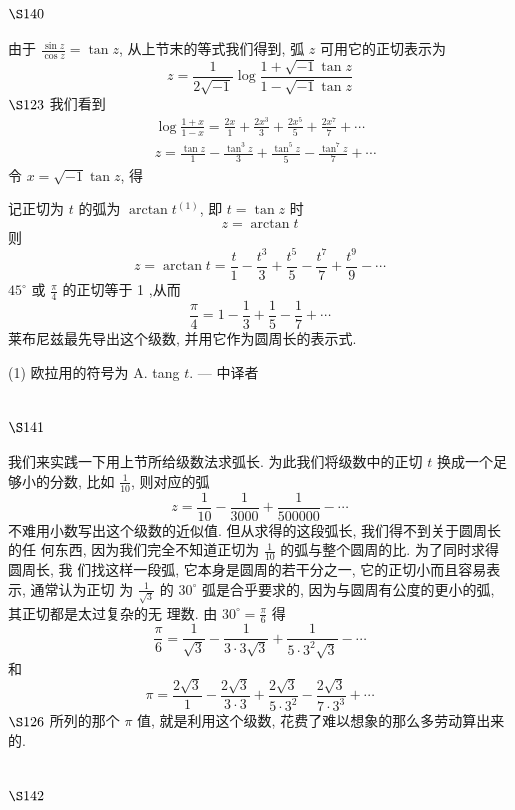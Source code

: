 \section{$\S 140$}

由于 $\frac{\sin z}{\cos z}=\tan z$, 从上节末的等式我们得到, 弧 $z$ 可用它的正切表示为
\[
z=\frac{1}{2 \sqrt{-1}} \log \frac{1+\sqrt{-1} \tan z}{1-\sqrt{-1} \tan z}
\]
$\S 123$ 我们看到
\[
\begin{aligned}
& \log \frac{1+x}{1-x}=\frac{2 x}{1}+\frac{2 x^{3}}{3}+\frac{2 x^{5}}{5}+\frac{2 x^{7}}{7}+\cdots \\
& z=\frac{\tan z}{1}-\frac{\tan ^{3} z}{3}+\frac{\tan ^{5} z}{5}-\frac{\tan ^{7} z}{7}+\cdots
\end{aligned}
\]
令 $x=\sqrt{-1} \tan z$, 得

记正切为 $t$ 的弧为 $\arctan t^{(1)}$, 即 $t=\tan z$ 时
\[
z=\arctan t
\]
则
\[
z=\arctan t=\frac{t}{1}-\frac{t^{3}}{3}+\frac{t^{5}}{5}-\frac{t^{7}}{7}+\frac{t^{9}}{9}-\cdots
\]
$45^{\circ}$ 或 $\frac{\pi}{4}$ 的正切等于 1 ,从而
\[
\frac{\pi}{4}=1-\frac{1}{3}+\frac{1}{5}-\frac{1}{7}+\cdots
\]
莱布尼兹最先导出这个级数, 并用它作为圆周长的表示式.

(1) 欧拉用的符号为 A. tang $t$. — 中译者 

\section{$\S 141$}

我们来实践一下用上节所给级数法求弧长. 为此我们将级数中的正切 $t$ 换成一个足 够小的分数, 比如 $\frac{1}{10}$, 则对应的弧
\[
z=\frac{1}{10}-\frac{1}{3000}+\frac{1}{500000}-\cdots
\]
不难用小数写出这个级数的近似值. 但从求得的这段弧长, 我们得不到关于圆周长的任 何东西, 因为我们完全不知道正切为 $\frac{1}{10}$ 的弧与整个圆周的比. 为了同时求得圆周长, 我 们找这样一段弧, 它本身是圆周的若干分之一, 它的正切小而且容易表示, 通常认为正切 为 $\frac{1}{\sqrt{3}}$ 的 $30^{\circ}$ 弧是合乎要求的, 因为与圆周有公度的更小的弧, 其正切都是太过复杂的无 理数. 由 $30^{\circ}=\frac{\pi}{6}$ 得
\[
\frac{\pi}{6}=\frac{1}{\sqrt{3}}-\frac{1}{3 \cdot 3 \sqrt{3}}+\frac{1}{5 \cdot 3^{2} \sqrt{3}}-\cdots
\]
和
\[
\pi=\frac{2 \sqrt{3}}{1}-\frac{2 \sqrt{3}}{3 \cdot 3}+\frac{2 \sqrt{3}}{5 \cdot 3^{2}}-\frac{2 \sqrt{3}}{7 \cdot 3^{3}}+\cdots
\]
$\S 126$ 所列的那个 $\pi$ 值, 就是利用这个级数, 花费了难以想象的那么多劳动算出来的.

\section{$\S 142$}

